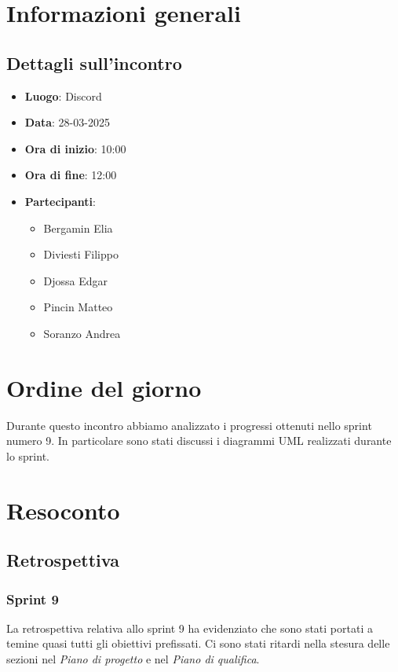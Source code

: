 \section{Informazioni generali}
\subsection{Dettagli sull'incontro}
\begin{itemize}
    \item \textbf{Luogo}: Discord
    \item \textbf{Data}: 28-03-2025
    \item \textbf{Ora di inizio}: 10:00
    \item \textbf{Ora di fine}: 12:00
    \item \textbf{Partecipanti}:
    \begin{itemize}
        \item Bergamin Elia
        \item Diviesti Filippo
        \item Djossa Edgar
        \item Pincin Matteo 
        \item Soranzo Andrea  
    \end{itemize}
\end{itemize}

\section{Ordine del giorno}
Durante questo incontro abbiamo analizzato i progressi ottenuti nello sprint numero 9.
In particolare sono stati discussi i diagrammi UML realizzati durante lo sprint.
\section{Resoconto}
\subsection{Retrospettiva}
\subsubsection{Sprint 9}
La retrospettiva relativa allo sprint 9 ha evidenziato che sono stati portati a temine quasi tutti gli obiettivi prefissati.
Ci sono stati ritardi nella stesura delle sezioni nel \textit{Piano di progetto} e nel \textit{Piano di qualifica}.

